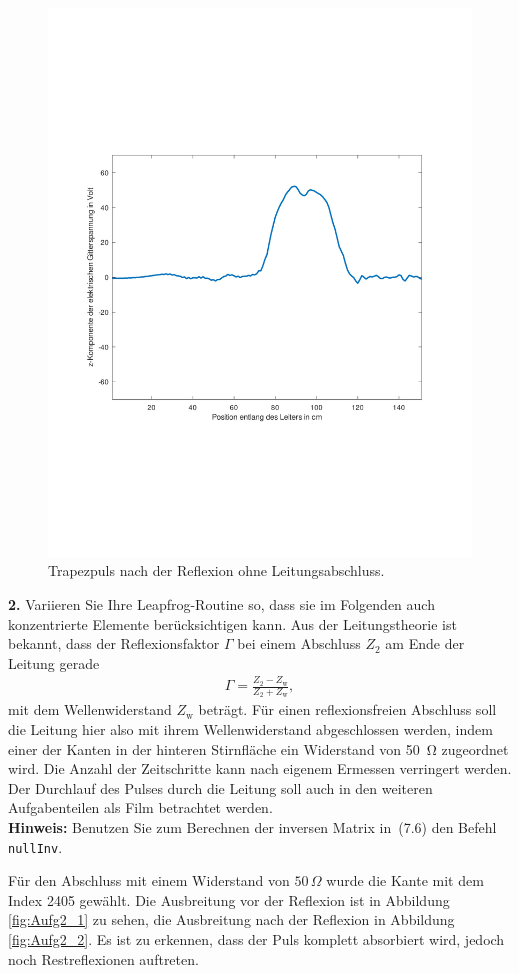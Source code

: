 \documentclass[Protokollheft.tex]{subfiles}
\begin{document}
\begin{figure}[ht]
	\centering
	\includegraphics[trim = 20mm 65mm 20mm 65mm, clip,width=0.7\linewidth]{Aufgabe1_2.pdf}
	\caption{Trapezpuls nach der Reflexion ohne Leitungsabschluss.}\label{fig:Aufg1_2}
\end{figure}

\begin{framed}
	\noindent \textbf{2.} Variieren Sie Ihre Leapfrog-Routine so, dass sie im
Folgenden auch konzentrierte Elemente berücksichtigen kann. Aus der Leitungstheorie 
ist bekannt, dass der Reflexionsfaktor $\Gamma$ bei einem Abschluss $Z_{\text{2}}$ am Ende der Leitung gerade 
\begin{align}
 \Gamma=\frac{Z_{\text{2}}-Z_{\text{w}}}{Z_{\text{2}}+Z_{\text{w}}},
\end{align}
mit dem Wellenwiderstand $Z_{\text{w}}$ beträgt. Für einen reflexionsfreien Abschluss soll die 
Leitung hier also mit ihrem Wellenwiderstand abgeschlossen werden,
indem einer der Kanten in der hinteren Stirnfläche ein Widerstand
von \SI{50}{\ohm} zugeordnet wird. Die Anzahl der Zeitschritte kann nach
eigenem Ermessen verringert werden. Der Durchlauf des Pulses durch
die Leitung soll auch in den weiteren Aufgabenteilen als Film
betrachtet werden.\label{exer:simIncludeLumped}\\
\textbf{Hinweis:} Benutzen Sie zum Berechnen der inversen Matrix 
in~(7.6) den Befehl \verb|nullInv|.
%
\end{framed}
\noindent
Für den Abschluss mit einem Widerstand von $50\,\Omega$ wurde die Kante mit dem Index 2405 gewählt. Die Ausbreitung vor der Reflexion ist in Abbildung \ref{fig:Aufg2_1} zu sehen, die Ausbreitung nach der Reflexion in Abbildung \ref{fig:Aufg2_2}. Es ist zu erkennen, dass der Puls komplett absorbiert wird, jedoch noch Restreflexionen auftreten.
\end{document}
